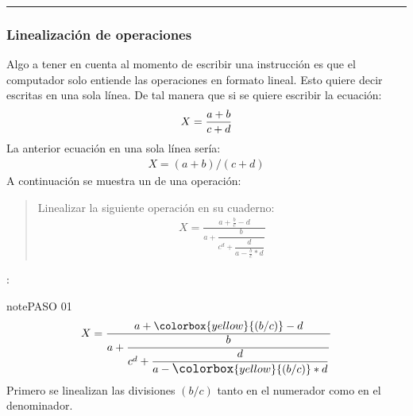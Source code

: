 \documentclass[letterpaper,10pt,spanish]{sphinxmanual}
\begin{document}
\bigskip\hrule\bigskip



\subsubsection{Linealización de operaciones}
\label{\detokenize{1_guias/10programacion/G1025:linealizacion-de-operaciones}}
\sphinxAtStartPar
Algo a tener en cuenta al momento de escribir una instrucción es que el computador solo entiende las operaciones en formato lineal. Esto quiere decir escritas en una sola línea. De tal manera que si se quiere escribir la ecuación:
\begin{equation*}
\begin{split}
X = {a + b \over c + d}
\end{split}
\end{equation*}
\sphinxAtStartPar
La anterior ecuación en una sola línea sería:
\begin{equation*}
\begin{split}
X = (a + b) / (c + d)
\end{split}
\end{equation*}
\sphinxAtStartPar
A continuación se muestra un  de una operación:
\begin{quote}

\sphinxAtStartPar
Linealizar la siguiente operación en su cuaderno:
\begin{equation}\label{equation:1_guias/10programacion/G1025:1_guias/10programacion/G1025:0}
\begin{split}X = \frac{a+\frac{b}{c}-d}{a+\dfrac{b}{c^{d}+\dfrac{d}{a-\frac{b}{c}*d}}}\end{split}
\end{equation}\end{quote}

\sphinxAtStartPar
{}:

\begin{sphinxadmonition}{note}{PASO 01}
\begin{equation}\label{equation:1_guias/10programacion/G1025:1_guias/10programacion/G1025:1}
\begin{split}X = \frac{a+\colorbox{yellow}{(b/c)}-d}{a+\dfrac{b}{c^{d}+\dfrac{d}{{\large a-\colorbox{yellow}{(b/c)}*d}}}}\end{split}
\end{equation}
\sphinxAtStartPar
Primero se linealizan las divisiones \((b/c)\) tanto en el numerador como en el denominador.
\end{sphinxadmonition}
\end{document}
